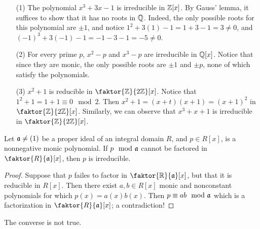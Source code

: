 \begin{example}\label{example_7.4}
    \begin{enumerate}
        \item[(1)] The polynomial $x^3+3x-1$ is irreducible in  $\mathbb{Z}[x]$. By
            Gauss' lemma, it suffices to show that it has no roots in $\mathbb{Q}$.
            Indeed, the only possible roots for this polynomial are  $\pm{1}$,
            and notice $1^2+3(1)-1=1+3-1=3 \neq 0$, and
            $(-1)^3+3(-1)-1=-1-3-1=-5 \neq 0$.

        \item[(2)] For every prime $p$,  $x^2-p$ and  $x^3-p$ are irreducible in
             $\mathbb{Q}[x]$. Notice that since they are monic, the only possible roots
             are $\pm{1}$ and $\pm{p}$, none of which satisfy the polynomials.

         \item[(3)] $x^2+1$ is reducible in  $\faktor{\Z}{2\Z}[x]$. Notice that
             $1^2+1=1+1 \equiv 0 \mod{2}$. Then $x^2+1=(x+t)(x+1)=(x+1)^2$ in
             $\faktor{\Z}{2\Z}[x]$. Similarly, we can observe that $x^3+x+1$ is
             irreducible in  $\faktor{\Z}{2\Z}[x]$.
    \end{enumerate}
\end{example}

\begin{lemma}\label{lemma_7.3.4}
    Let $\mathfrak{a} \neq (1)$ be a proper ideal of an integral domain $R$, and  $p \in
    R[x]$, is a nonnegative monic polynomial. If $p \mod{\mathfrak{a}}$ cannot be factored
    in $\faktor{R}{\af}[x]$, then $p$ is irreducible.
\end{lemma}
\begin{proof}
    Suppose that $p$ failes to factor in  $\faktor{\R}{\af}[x]$, but that it is
    reducible in $R[x]$. Then there exist $a,b \in R[x]$ monic and nonconstant
    polynomials for which $p(x)=a(x)b(x)$. Then $p \equiv ab \mod{\mathfrak{a}}$ which is a
    factorization in $\faktor{R}{\af}[x]$; a contradiction!
\end{proof}
\begin{remark}
    The converse is not true.
\end{remark}

